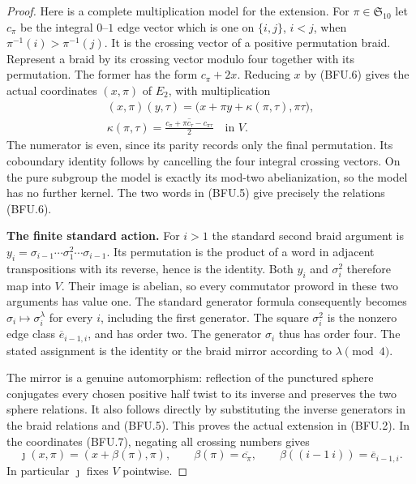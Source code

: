 \begin{proof}
Here is a complete multiplication model for the extension.
For $\pi\in\mathfrak S_{10}$ let $c_\pi$ be the integral
$0$--$1$ edge vector which is one on $\{i,j\}$, $i<j$,
when $\pi^{-1}(i)>\pi^{-1}(j)$.  It is the crossing vector
of a positive permutation braid.  Represent a braid by its
crossing vector modulo four together with its permutation.
The former has the form $c_\pi+2x$.  Reducing $x$ by
(BFU.6) gives the actual coordinates $(x,\pi)$ of $E_2$,
with multiplication
\[
\begin{gathered}
 (x,\pi)(y,\tau)
   =\bigl(x+\pi y+\kappa(\pi,\tau),\pi\tau\bigr),\\
 \kappa(\pi,\tau)
   =\overline{\frac{c_\pi+\pi c_\tau-c_{\pi\tau}}2}
       \quad\text{in }V.
\end{gathered}                                                  \tag{BFU.7}
\]
The numerator is even, since its parity records only the
final permutation.  Its coboundary identity follows by
cancelling the four integral crossing vectors.  On the pure
subgroup the model is exactly its mod-two abelianization,
so the model has no further kernel.  The two words in
(BFU.5) give precisely the relations (BFU.6).

\par\medskip\noindent\textbf{The finite standard action.}\quad
For $i>1$ the standard second braid argument is
$y_i=\sigma_{i-1}\cdots\sigma_1^2\cdots\sigma_{i-1}$.
Its permutation is the product of a word in adjacent
transpositions with its reverse, hence is the identity.
Both $y_i$ and $\sigma_i^2$ therefore map into $V$.
Their image is abelian, so every commutator proword in
these two arguments has value one.  The standard generator
formula consequently becomes $\sigma_i\mapsto\sigma_i^\lambda$
for every $i$, including the first generator.
The square $\sigma_i^2$ is the nonzero edge class
$\overline e_{i-1,i}$, and has order two.  The generator
$\sigma_i$ thus has order four.  The stated assignment
is the identity or the braid mirror according to
$\lambda\pmod4$.

The mirror is a genuine automorphism: reflection of the
punctured sphere conjugates every chosen positive half twist
to its inverse and preserves the two sphere relations.
It also follows directly by substituting the inverse
generators in the braid relations and (BFU.5).
This proves the actual extension in (BFU.2).  In the
coordinates (BFU.7), negating all crossing numbers gives
\[
 \jmath(x,\pi)=(x+\beta(\pi),\pi),\qquad
 \beta(\pi)=\overline{c_\pi},\qquad
 \beta((i-1\ i))=\overline e_{i-1,i}.
                                                               \tag{BFU.8}
\]
In particular $\jmath$ fixes $V$ pointwise.


\end{proof}
